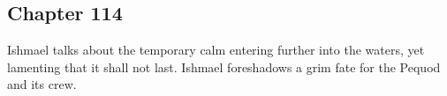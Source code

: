 \subsection{Chapter 114}

Ishmael talks about the temporary calm entering further into the waters, yet lamenting that it shall not last. Ishmael foreshadows a grim fate for the Pequod and its crew.
